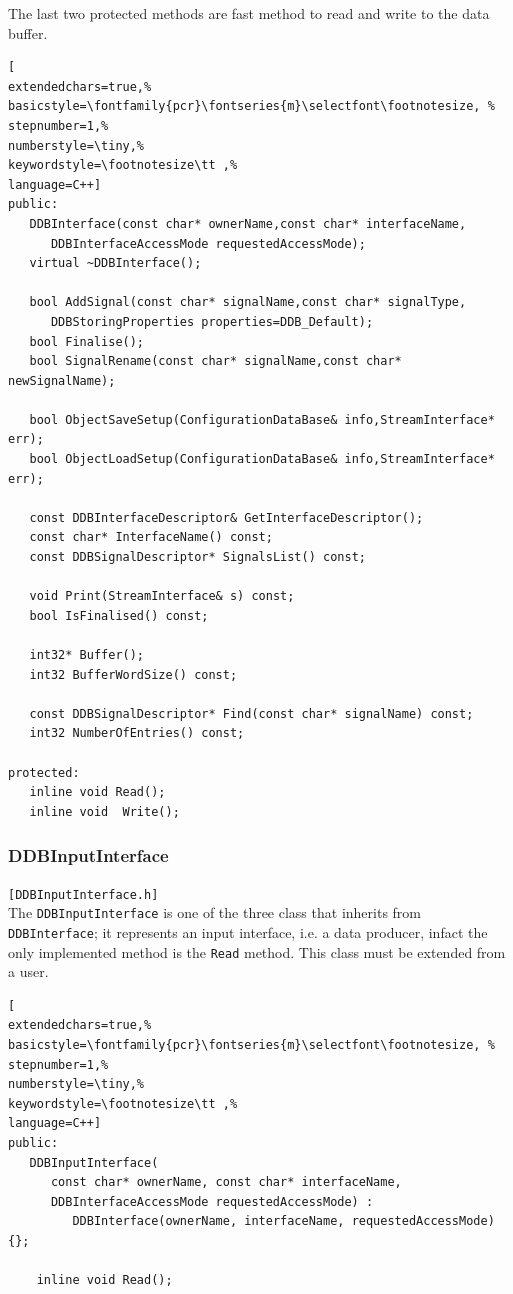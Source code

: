 The last two protected methods are fast method to read and write to the data buffer.

\begin{lstlisting}[
extendedchars=true,%
basicstyle=\fontfamily{pcr}\fontseries{m}\selectfont\footnotesize, %
stepnumber=1,%
numberstyle=\tiny,%
keywordstyle=\footnotesize\tt ,%
language=C++]
public:
   DDBInterface(const char* ownerName,const char* interfaceName,
      DDBInterfaceAccessMode requestedAccessMode);
   virtual ~DDBInterface();

   bool AddSignal(const char* signalName,const char* signalType,
      DDBStoringProperties properties=DDB_Default);
   bool Finalise();
   bool SignalRename(const char* signalName,const char* newSignalName);

   bool ObjectSaveSetup(ConfigurationDataBase& info,StreamInterface* err);
   bool ObjectLoadSetup(ConfigurationDataBase& info,StreamInterface* err);

   const DDBInterfaceDescriptor& GetInterfaceDescriptor();
   const char* InterfaceName() const;
   const DDBSignalDescriptor* SignalsList() const;

   void Print(StreamInterface& s) const;
   bool IsFinalised() const;

   int32* Buffer();
   int32 BufferWordSize() const;

   const DDBSignalDescriptor* Find(const char* signalName) const;
   int32 NumberOfEntries() const;

protected:
   inline void Read();
   inline void  Write();
\end{lstlisting}



\subsubsection{DDBInputInterface}
\texttt{[DDBInputInterface.h]}\\
The \texttt{DDBInputInterface} is one of the three class that inherits from \texttt{DDBInterface}; it represents an input interface, i.e. a data producer, infact the only implemented method is the \texttt{Read} method. This class must be extended from a user.
\begin{lstlisting}[
extendedchars=true,%
basicstyle=\fontfamily{pcr}\fontseries{m}\selectfont\footnotesize, %
stepnumber=1,%
numberstyle=\tiny,%
keywordstyle=\footnotesize\tt ,%
language=C++]
public:
   DDBInputInterface(
      const char* ownerName, const char* interfaceName,
      DDBInterfaceAccessMode requestedAccessMode) :
         DDBInterface(ownerName, interfaceName, requestedAccessMode){};

    inline void Read();
\end{lstlisting}



